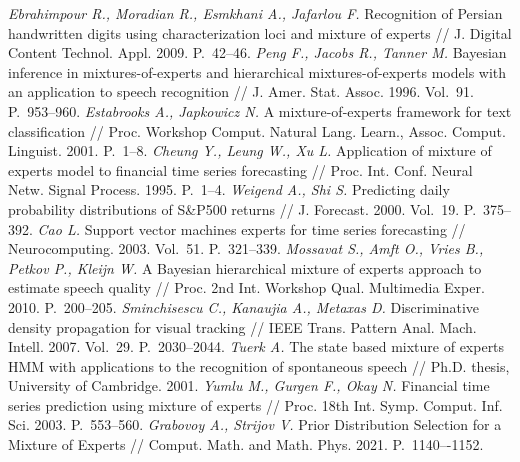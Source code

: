 \documentclass[12pt]{a&t}
\begin{document}
\begin{thebibliography}{}
	\textit{Ebrahimpour R., Moradian R., Esmkhani A., Jafarlou F.} Recognition of Persian handwritten digits using characterization loci and mixture of experts // J. Digital Content Technol. Appl. 2009. P.~42--46.
	\textit{Peng F., Jacobs R., Tanner M.} Bayesian inference in mixtures-of-experts and hierarchical mixtures-of-experts models with an application to speech recognition // J. Amer. Stat. Assoc. 1996. Vol.~91. P.~953--960.
	\textit{Estabrooks A., Japkowicz N.} A mixture-of-experts framework for text classification // Proc. Workshop Comput. Natural Lang. Learn., Assoc. Comput. Linguist. 2001. P.~1--8.
	\textit{Cheung Y., Leung W., Xu L.} Application of mixture of experts model to financial time series forecasting // Proc. Int. Conf. Neural Netw. Signal Process. 1995. P.~1--4.
	\textit{Weigend A., Shi S.} Predicting daily probability distributions of S\&P500 returns // J. Forecast. 2000. Vol.~19. P.~375--392.
	\textit{Cao L.} Support vector machines experts for time series forecasting // Neurocomputing. 2003. Vol.~51. P.~321--339.
	\textit{Mossavat S., Amft O., Vries B., Petkov P., Kleijn W.} A Bayesian hierarchical mixture of experts approach to estimate speech quality // Proc. 2nd Int. Workshop Qual. Multimedia Exper. 2010. P.~200--205.
	\textit{Sminchisescu C., Kanaujia A., Metaxas D.} Discriminative density propagation for visual tracking // IEEE Trans. Pattern Anal. Mach. Intell. 2007. Vol.~29. P.~2030--2044.
	\textit{Tuerk A.} The state based mixture of experts HMM with applications to the recognition of spontaneous speech // Ph.D. thesis, University of Cambridge. 2001.
	\textit{Yumlu M., Gurgen F.,  Okay N.} Financial time series prediction using mixture of experts // Proc. 18th Int. Symp. Comput. Inf. Sci. 2003. P.~553--560.
	\textit{Grabovoy A., Strijov V.} Prior Distribution Selection for a Mixture of Experts // Comput. Math. and Math. Phys. 2021. P.~1140–-1152.
\end{thebibliography}
\end{document}
